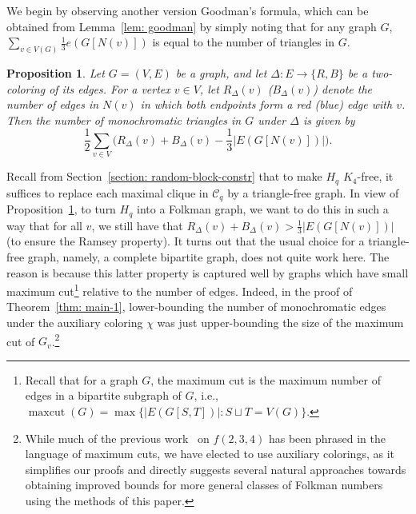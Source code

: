 \documentclass[A4paper,reqno,oneside,12pt]{amsart}
\theoremstyle{plain}
\newtheorem{proposition}[theorem]{Proposition}
\theoremstyle{definition}
\newcommand{\scC}{\mathscr{C}}
\newcommand{\maxcut}{\operatorname{maxcut}}
\begin{document}
We begin by observing another version Goodman's formula, which can be obtained from Lemma~\ref{lem: goodman} by simply noting that for any graph $G$, $\sum_{v \in V(G)} \frac{1}{3}e(G[N(v)])$ is equal to the number of triangles in $G$.

\begin{proposition}
\label{prp: goodman}
    Let $G = (V,E)$ be a graph, and let $\Delta: E \to \{R,B\}$ be a two-coloring of its edges.
    For a vertex $v \in V$, let $R_{\Delta}(v)$ ($B_\Delta(v)$) denote the number of edges in $N(v)$ in which both endpoints form a red (blue) edge with $v$.
    Then the number of monochromatic triangles in $G$ under $\Delta$ is given by
    \begin{equation*}
        \frac{1}{2} \sum_{v \in V} {\Big (} R_\Delta(v) + B_\Delta(v) - \frac{1}{3}|E(G[N(v)])| {\Big )}.
    \end{equation*}
\end{proposition}

Recall from Section~\ref{section: random-block-constr} that to make $H_q$ $K_4$-free, it suffices to replace each maximal clique in $\scC_q$ by a triangle-free graph.
In view of Proposition~\ref{prp: goodman}, to turn $H_q$ into a Folkman graph, we want to do this in such a way that for all $v$, we still have that $R_\Delta(v) + B_\Delta(v) > \frac{1}{3}|E(G[N(v)])|$ (to ensure the Ramsey property).
It turns out that the usual choice for a triangle-free graph, namely, a complete bipartite graph, does not quite work here.
The reason is because this latter property is captured well by graphs which have small maximum cut\footnote{Recall that for a graph $G$, the maximum cut is the maximum number of edges in a bipartite subgraph of $G$, i.e., $\maxcut(G) = \max \{ |E(G[S,T])|: S \sqcup T = V(G) \}$.} relative to the number of edges.
Indeed, in the proof of Theorem~\ref{thm: main-1}, lower-bounding the number of monochromatic edges under the auxiliary coloring $\chi$ was just upper-bounding the size of the maximum cut of $G_v$.\footnote{While much of the previous work~\cite{DR08-1, DR08-2, FR86, LRX14, S88} on $f(2,3,4)$ has been phrased in the language of maximum cuts, we have elected to use auxiliary colorings, as it simplifies our proofs and directly suggests several natural approaches towards obtaining improved bounds for more general classes of Folkman numbers using the methods of this paper.}
\end{document}
